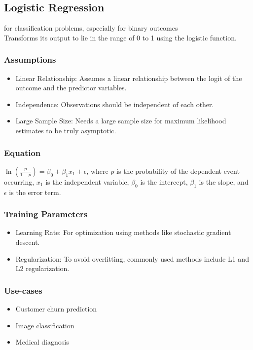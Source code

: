 \documentclass[english]{latex4ei/latex4ei_sheet}
\begin{document}
\begin{sectionbox}
\subsection{Logistic Regression}
for classification problems, especially for binary outcomes\\
Transforms its output to lie in the range of 0 to 1 using the logistic function.

\subsubsection{Assumptions}
\begin{itemize}
    \item Linear Relationship: Assumes a linear relationship between the logit of the outcome and the predictor variables.
    \item Independence: Observations should be independent of each other.
    \item Large Sample Size: Needs a large sample size for maximum likelihood estimates to be truly asymptotic.
\end{itemize}

\subsubsection{Equation}
\( \ln\left(\frac{p}{1-p}\right) = \beta_0 + \beta_1 x_1 + \epsilon \), where \( p \) is the probability of the dependent event occurring, \( x_1 \) is the independent variable, \( \beta_0 \) is the intercept, \( \beta_1 \) is the slope, and \( \epsilon \) is the error term.

\subsubsection{Training Parameters}
\begin{itemize}
    \item Learning Rate: For optimization using methods like stochastic gradient descent.
    \item Regularization: To avoid overfitting, commonly used methods include L1 and L2 regularization.
\end{itemize}

\subsubsection{Use-cases}
\begin{itemize}
    \item Customer churn prediction
    \item Image classification
    \item Medical diagnosis
\end{itemize}


\end{sectionbox}
\end{document}
